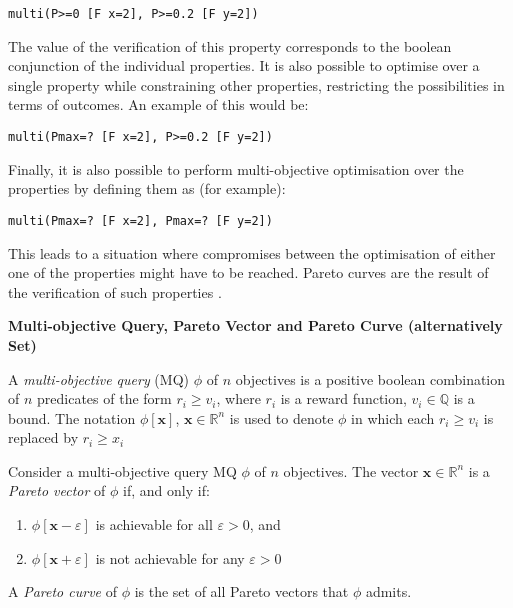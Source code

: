 \begin{minipage}{\linewidth}
{\vspace{1em}
\begin{lstlisting}
multi(P>=0 [F x=2], P>=0.2 [F y=2])
\end{lstlisting}
}
\end{minipage}

The value of the verification of this property corresponds to the boolean conjunction of the individual properties. It is also possible to optimise over a single property while constraining other properties, restricting the possibilities in terms of outcomes. An example of this would be:

\begin{minipage}{\linewidth}
{\vspace{1em}
\begin{lstlisting}
multi(Pmax=? [F x=2], P>=0.2 [F y=2])
\end{lstlisting}
}
\end{minipage}

Finally, it is also possible to perform multi-objective optimisation over the properties by defining them as (for example):

\begin{minipage}{\linewidth}
{\vspace{1em}
\begin{lstlisting}
multi(Pmax=? [F x=2], Pmax=? [F y=2])
\end{lstlisting}
}
\end{minipage}

This leads to a situation where compromises between the optimisation of either one of the properties might have to be reached. Pareto curves are the result of the verification of such properties \cite{pareto}.

{\begin{defi}
{\setlength{\parskip}{2em}
\textbf{Multi-objective Query, Pareto Vector and Pareto Curve (alternatively Set)}\vspace{1em}\\}
{\setlength{\parskip}{1em} 
A \textit{multi-objective query} (MQ) $\phi$ of $n$ objectives is a positive boolean combination of $n$ predicates of the form $r_i \geq v_i$, where $r_i$ is a reward function, $v_i \in \mathbb{Q}$ is a bound. The notation $\phi[\mathbf{x}]$, $\mathbf{x} \in \mathbb{R}^n$ is used to denote $\phi$ in which each $r_i \geq v_i$ is replaced by $r_i \geq x_i$

Consider a multi-objective query MQ $\phi$ of $n$ objectives. The vector $\mathbf{x} \in \mathbb{R}^n$ is a \textit{Pareto vector} of $\phi$ if, and only if:

\begin{enumerate}
	\item $\phi[\mathbf{x} - \varepsilon]$ is achievable for all $\varepsilon > 0$, and
	\item $\phi[\mathbf{x} + \varepsilon]$ is not achievable for any $\varepsilon > 0$
\end{enumerate}

A \textit{Pareto curve} of $\phi$ is the set of all Pareto vectors that $\phi$ admits.

}
\end{defi}}

